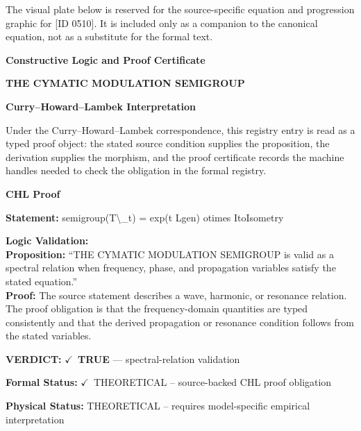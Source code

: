 \begingroup\footnotesize\sloppy
The visual plate below is reserved for the source-specific equation and progression graphic for [ID 0510]. It is included only as a companion to the canonical equation, not as a substitute for the formal text.
\par\endgroup
\ifTZPDarkEdition
{}
\fi

\clearpage
\begingroup\tzpsupportsetup
\noindent\textbf{\fontsize{10.8pt}{12.8pt}\selectfont [ID 0510] Constructive Logic and Proof Certificate}\par
\noindent\textbf{\fontsize{10pt}{12pt}\selectfont THE CYMATIC MODULATION SEMIGROUP}\par
\vspace{0.45em}
\begingroup
\footnotesize
\setlength{\parskip}{0.22em}
\setlength{\parindent}{0pt}
\noindent\textbf{Curry--Howard--Lambek Interpretation}\par
Under the Curry--Howard--Lambek correspondence, this registry entry is read as a typed proof
object: the stated source condition supplies the proposition, the derivation supplies the
morphism, and the proof certificate records the machine handles needed to check the obligation
in the formal registry.

\vspace{0.45em}
\noindent\textbf{CHL Proof}\par
\textbf{Statement:} semigroup(T\textbackslash{}\_t) = exp(t Lgen) otimes ItoIsometry

\textbf{Logic Validation:}\\
\textbf{Proposition:} ``THE CYMATIC MODULATION SEMIGROUP is valid as a spectral relation when frequency, phase,
and propagation variables satisfy the stated equation.''\\
\textbf{Proof:} The source statement describes a wave, harmonic, or resonance relation. The proof
obligation is that the frequency-domain quantities are typed consistently and that the
derived propagation or resonance condition follows from the stated variables.

\textbf{VERDICT:} \ensuremath{\checkmark}\ \textbf{TRUE} --- spectral-relation validation

\textbf{Formal Status:} \ensuremath{\checkmark}\ THEORETICAL -- source-backed CHL proof obligation

\textbf{Physical Status:} THEORETICAL -- requires model-specific empirical interpretation
\par\vspace{0.45em}
\par
\ifTZPDarkEdition
{}
\fi
\endgroup
\endgroup
